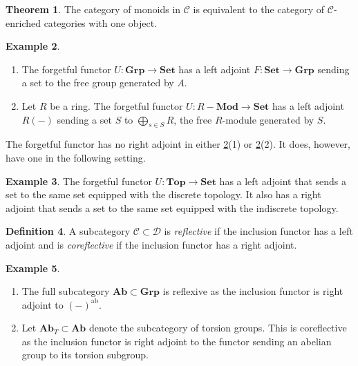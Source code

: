 \documentclass[10pt,letterpaper,cm]{nupset}
\theoremstyle{definition}
\newtheorem{definition}{Definition}[section]
\newtheorem{exmp}[definition]{Example}
\theoremstyle{theorem}
\newtheorem{theorem}[definition]{Theorem}
\theoremstyle{remark}
\newcommand{\1}{\mathbf{1}}
\renewcommand{\c}{\mathscr{C}}
\renewcommand{\d}{\mathscr{D}}
\newcommand{\0}{\vec 0}
\DeclareMathOperator{\ab}{ab}
\begin{document}
\begin{theorem}
The category of monoids in $\c$ is equivalent to the category of $\c$-enriched categories with one object.
\end{theorem}

\smallskip

\begin{exmp}\label{U1} $ $
\begin{enumerate}[label=(\arabic*)]
\item The forgetful functor $U: \mathbf{Grp} \to \mathbf{Set}$ has a left adjoint $F: \mathbf{Set} \to \mathbf{Grp}$ sending a set to the free group generated by $A$. 
\item Let $R$ be a ring. The forgetful functor $U: R{-}\mathbf{Mod}\to \mathbf{Set}$ has a left adjoint $R(-)$ sending a set $S$ to $\bigoplus_{s\in S} R$, the free $R$-module generated by $S$.
\end{enumerate}
\end{exmp}



The forgetful functor has no right adjoint in either \cref{U1}(1) or \cref{U1}(2). It does, however, have one in the following setting.


\begin{exmp}
The forgetful functor $U: \mathbf{Top} \to \mathbf{Set}$ has a left adjoint that sends a set to the same set equipped with the discrete topology.  It also has a right adjoint that sends a set to the same set equipped with the indiscrete topology.
\end{exmp}

\smallskip

\begin{definition}
A subcategory $\c \subset \d$ is \textit{reflective} if the inclusion functor has a left adjoint and is \textit{coreflective} if the inclusion functor has a right adjoint. 
\end{definition}

\begin{exmp} $ $
\begin{enumerate}
\item The full subcategory $\mathbf{Ab}\subset \mathbf{Grp}$ is reflexive as the inclusion functor is right adjoint to $\left(-\right)^{\ab}$.
\item
Let $\mathbf{Ab}_T\subset \mathbf{Ab}$ denote the subcategory of torsion groups. This is coreflective as the inclusion functor is right adjoint to the functor sending an abelian group to its torsion subgroup.
\end{enumerate}
\end{exmp}
\end{document}
